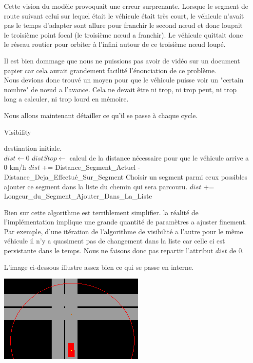 \documentclass[a4paper,11pt]{article}
\begin{document}
Cette vision du modèle provoquait une erreur surprenante. Lorsque le segment de route suivant celui sur lequel était le véhicule était très court, le véhicule n'avait pas le temps d'adapter sont allure pour franchir le second n\oe{}ud et donc loupait le troisième point focal (le troisième n\oe{}ud a franchir). Le véhicule quittait donc le réseau routier pour orbiter à l'infini autour de ce troisième n\oe{}ud loupé.

Il est bien dommage que nous ne puissions pas avoir de vidéo sur un document papier car cela aurait grandement facilité l'énonciation de ce problème.\\

Nous devions donc trouvé un moyen pour que le véhicule puisse voir un "certain nombre" de n\oe{}ud a l'avance. Cela ne devait être ni trop, ni trop peut, ni trop long a calculer, ni trop lourd en mémoire.

Nous allons maintenant détailler ce qu'il se passe à chaque cycle.\\

\begin{algorithm}
\caption{Visibility}
\begin{algorithmic}
\REQUIRE destination initiale.\\
\STATE $dist \leftarrow 0 $
\STATE $distStop \leftarrow$ calcul de la distance nécessaire pour que le véhicule arrive a 0 km/h
\STATE $dist$ += Distance\_Segment\_Actuel - Distance\_Deja\_Effectué\_Sur\_Segment
\STATE Choisir un segment parmi ceux possibles
\STATE ajouter ce segment dans la liste du chemin qui sera parcouru.
\STATE $dist$ += Longeur\_du\_Segment\_Ajouter\_Dans\_La\_Liste
\ENDWHILE
\end{algorithmic}
\end{algorithm}

Bien sur cette algorithme est terriblement simplifier. la réalité de l'implémentation implique une grande quantité de paramètres a ajuster finement. Par exemple, d'une itération de l'algorithme de visibilité a l'autre pour le même véhicule il n'y a quasiment pas de changement dans la liste car celle ci est persistante dans le temps. Nous ne faisons donc pas repartir l'attribut $dist$ de $0$.

L'image ci-dessous illustre assez bien ce qui se passe en interne.

\vspace{0.25cm}
\includegraphics[scale=0.6]{imgAlgo/disttistop.png}\\
\end{document}
